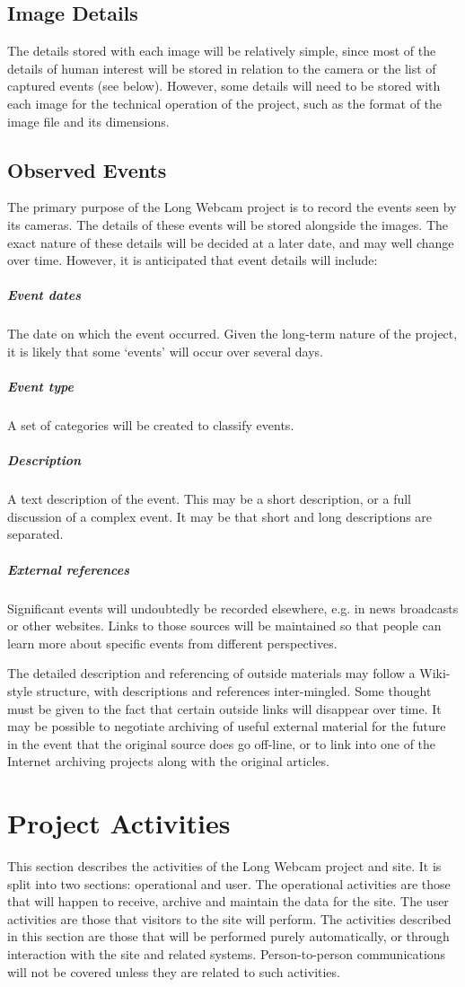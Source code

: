 \documentclass[11pt]{article}
\begin{document}
\subsection{Image Details}
The details stored with each image will be relatively simple, since most of the details of human interest will be stored in relation to the camera or the list of captured events (see below). However, some details will need to be stored with each image for the technical operation of the project, such as the format of the image file and its dimensions.

\subsection{Observed Events}
The primary purpose of the Long Webcam project is to record the events seen by its cameras. The details of these events will be stored alongside the images. The exact nature of these details will be decided at a later date, and may well change over time. However, it is anticipated that event details will include:

\subparagraph{Event dates} The date on which the event occurred. Given the long-term nature of the project, it is likely that some `events' will occur over several days.
\subparagraph{Event type} A set of categories will be created to classify events.
\subparagraph{Description} A text description of the event. This may be a short description, or a full discussion of a complex event. It may be that short and long descriptions are separated.
\subparagraph{External references} Significant events will undoubtedly be recorded elsewhere, e.g. in news broadcasts or other websites. Links to those sources will be maintained so that people can learn more about specific events from different perspectives.

\vspace{0.75cm}
The detailed description and referencing of outside materials may follow a Wiki-style structure, with descriptions and references inter-mingled. Some thought must be given to the fact that certain outside links will disappear over time. It may be possible to negotiate archiving of useful external material for the future in the event that the original source does go off-line, or to link into one of the Internet archiving projects along with the original articles.

\clearpage
\section{Project Activities}
This section describes the activities of the Long Webcam project and site. It is split into two sections: operational and user. The operational activities are those that will happen to receive, archive and maintain the data for the site. The user activities are those that visitors to the site will perform. The activities described in this section are those that will be performed purely automatically, or through interaction with the site and related systems. Person-to-person communications will not be covered unless they are related to such activities.
\end{document}
